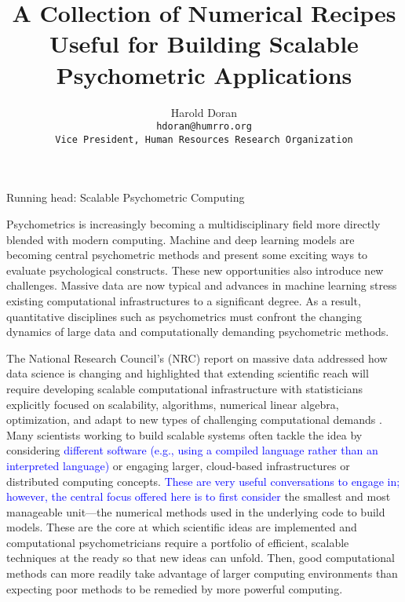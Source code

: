 \documentclass[12pt]{article}
\title{A Collection of Numerical Recipes Useful for Building Scalable Psychometric Applications}
\author{Harold Doran\\
	\texttt{hdoran@humrro.org}\\
	\texttt{Vice President, Human Resources Research Organization}\\
	}
\begin{document}
 
\baselineskip 24pt %
Running head: Scalable Psychometric Computing

Psychometrics is increasingly becoming a multidisciplinary field more directly blended with modern computing. Machine and deep learning models are becoming central psychometric methods and present some exciting ways to evaluate psychological constructs. These new opportunities also introduce new challenges. Massive data are now typical and advances in machine learning stress existing computational infrastructures to a significant degree. As a result, quantitative disciplines such as psychometrics must confront the changing dynamics of large data and computationally demanding psychometric methods. 

The National Research Council's (NRC) report on massive data addressed how data science is changing and highlighted that extending scientific reach will require developing scalable computational infrastructure with statisticians explicitly focused on scalability, algorithms, numerical linear algebra, optimization, and adapt to new types of challenging computational demands \cite{massive}. Many scientists working to build scalable systems often tackle the idea by considering \textcolor{blue}{different software (e.g., using a compiled language rather than an interpreted language)} or engaging larger, cloud-based infrastructures or distributed computing concepts. \textcolor{blue}{These are very useful conversations to engage in; however, the central focus offered here is to first consider} the smallest and most manageable unit---the numerical methods used in the underlying code to build models. These are the core at which scientific ideas are implemented and computational psychometricians require a portfolio of efficient, scalable techniques at the ready so that new ideas can unfold. Then, good computational methods can more readily take advantage of larger computing environments than expecting poor methods to be remedied by more powerful computing. 
\end{document}
